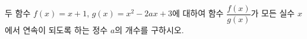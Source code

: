 두 함수 $f(x)=x+1$, $g(x)=x^2-2ax+3$에 대하여 함수 $\dfrac{f(x)}{g(x)}$가 모든 실수 $x$에서 연속이 되도록 하는 정수 $a$의 개수를 구하시오.
